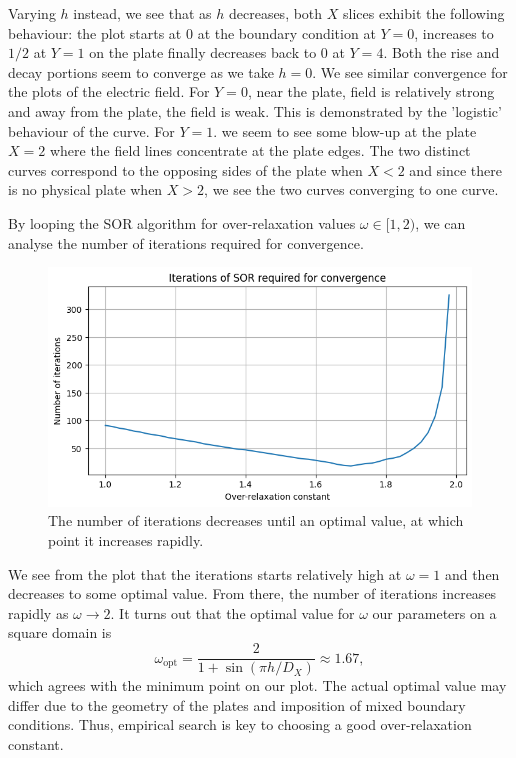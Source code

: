 \documentclass{article}
\begin{document}
Varying \(h\) instead, we see that as \(h\) decreases, both \(X\) slices exhibit the following behaviour: the plot starts at \(0\) at the boundary condition at \(Y = 0\), increases to \(1/2\) at \(Y=1\) on the plate finally decreases back to \(0\) at \(Y=4\). Both the rise and decay portions seem to converge as we take \(h = 0\). We see similar convergence for the plots of the electric field. For \(Y = 0\), near the plate, field is relatively strong and away from the plate, the field is weak. This is demonstrated by the 'logistic' behaviour of the curve. For \(Y = 1\). we seem to see some blow-up at the plate \(X=2\) where the field lines concentrate at the plate edges. The two distinct curves correspond to the opposing sides of the plate when \(X < 2\) and since there is no physical plate when \(X > 2\), we see the two curves converging to one curve.

By looping the SOR algorithm for over-relaxation values \(\omega \in [1,2)\), we can analyse the number of iterations required for convergence.

\begin{figure}
    \centering
    \includegraphics[width=1.0\linewidth]{images/relax.png}
    \caption{The number of iterations decreases until an optimal value, at which point it increases rapidly.}
\end{figure}

We see from the plot that the iterations starts relatively high at \(\omega = 1\) and then decreases to some optimal value. From there, the number of iterations increases rapidly as \(\omega \to 2\). It turns out that the optimal value for \(\omega\) our parameters on a square domain is 
\[ \omega_{\mathrm{opt}} = \frac{2}{1 + \sin(\pi h/D_X)} \approx 1.67, \]
which agrees with the minimum point on our plot. The actual optimal value may differ due to the geometry of the plates and imposition of mixed boundary conditions. Thus, empirical search is key to choosing a good over-relaxation constant.
\end{document}
